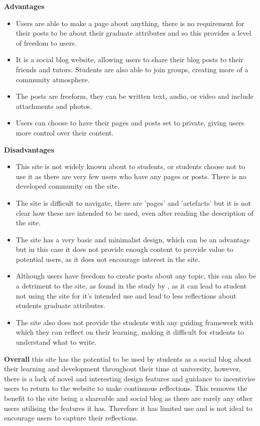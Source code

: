 \documentclass{l4proj}
\begin{document}
\textbf{Advantages}
\begin{itemize}
    \item Users are able to make a page about anything, there is no requirement for their posts to be about their graduate attributes and so this provides 
    a level of freedom to users.
    \item It is a social blog website, allowing users to share their blog posts to their friends and tutors. Students are also able to join groups, creating 
    more of a community atmosphere.
    \item The posts are freeform, they can be written text, audio, or video and include attachments and photos. 
    \item Users can choose to have their pages and posts set to private, giving users more control over their content.
\end{itemize}

\textbf{Disadvantages}
\begin{itemize}
    \item This site is not widely known about to students, or students choose not to use it as there are very few users who have any pages or posts. There is
    no developed community on the site.
    \item The site is difficult to navigate, there are 'pages' and 'artefacts' but it is not clear how these are intended to be used, even after reading the 
    description of the site. 
    \item The site has a very basic and minimalist design, which can be an advantage but in this case it does not provide enough content to provide value
    to potential users, as it does not encourage interest in the site.
    \item Although users have freedom to create posts about any topic, this can also be a detriment to the site, as found in the study by 
    \citet{mcdermott_developing_nodate}, as it can lead to student not using the site for it's intended use and lead to less reflections about students graduate 
    attributes.
    \item The site also does not provide the students with any guiding framework with which they can reflect on their learning, making it difficult for students
    to understand what to write.
\end{itemize}

\textbf{Overall} this site has the potential to be used by students as a social blog about their learning and development throughout their time at university,
however, there is a lack of novel and interesting design features and guidance to incentivise users to return to the website to make continuous reflections.
This removes the benefit to the site being a shareable and social blog as there are rarely any other users utilising the features it has. Therefore it has
limited use and is not ideal to encourage users to capture their reflections.
\end{document}
